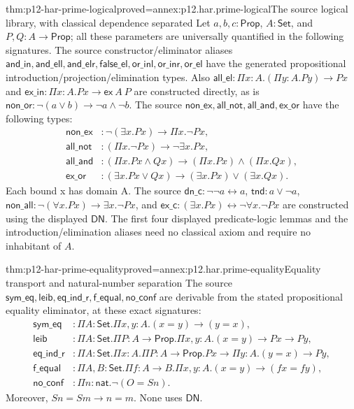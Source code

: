 \begin{hblemma}{thm:p12-har-prime-logical}{proved=annex:p12.har.prime-logical}{The source logical library, with classical dependence separated}
Let \(a,b,c:\mathsf{Prop}\), \(A:\mathsf{Set}\), and
\(P,Q:A\to\mathsf{Prop}\); all these parameters are universally
quantified in the following signatures.
The source constructor/eliminator aliases
\(\mathsf{and\_in},\mathsf{and\_ell},\mathsf{and\_elr},
\mathsf{false\_el},\mathsf{or\_inl},\mathsf{or\_inr},\mathsf{or\_el}\)
have the generated propositional introduction/projection/elimination
types. Also \(\mathsf{all\_el}:\Pi x:A.(\Pi y:A.P y)\to P x\)
and \(\mathsf{ex\_in}:\Pi x:A.P x\to\mathsf{ex}\ A\ P\)
are constructed directly, as is
\(\mathsf{non\_or}:\neg(a\vee b)\to\neg a\wedge\neg b\).
The source \(\mathsf{non\_ex},\mathsf{all\_not},\mathsf{all\_and},
\mathsf{ex\_or}\) have the following types:
\[
\begin{aligned}
 \mathsf{non\_ex}&:\neg(\exists x.P x)\to\Pi x.\neg P x,\\
 \mathsf{all\_not}&:(\Pi x.\neg P x)\to\neg\exists x.P x,\\
 \mathsf{all\_and}&:(\Pi x.P x\wedge Q x)\to
                         (\Pi x.P x)\wedge(\Pi x.Q x),\\
 \mathsf{ex\_or}&:(\exists x.P x\vee Q x)\to
                         (\exists x.P x)\vee(\exists x.Q x).
\end{aligned}
\]
Each bound x has domain A. The source
\(\mathsf{dn\_c}:\neg\neg a\leftrightarrow a\),
\(\mathsf{tnd}:a\vee\neg a\),
\(\mathsf{non\_all}:\neg(\forall x.P x)\to\exists x.\neg P x\),
and \(\mathsf{ex\_c}:(\exists x.P x)\leftrightarrow\neg\forall x.\neg P x\)
are constructed using the displayed \(\mathsf{DN}\). The first four
displayed predicate-logic lemmas and the introduction/elimination aliases
need no classical axiom and require no inhabitant of \(A\).
\end{hblemma}

\begin{hblemma}{thm:p12-har-prime-equality}{proved=annex:p12.har.prime-equality}{Equality transport and natural-number separation}
The source \(\mathsf{sym\_eq},\mathsf{leib},\mathsf{eq\_ind\_r},
\mathsf{f\_equal},\mathsf{no\_conf}\) are derivable from the stated
propositional equality eliminator, at these exact signatures:
\[
\begin{aligned}
 \mathsf{sym\_eq}&:\Pi A:\mathsf{Set}.\Pi x,y:A.(x=y)\to(y=x),\\
 \mathsf{leib}&:\Pi A:\mathsf{Set}.\Pi P:A\to\mathsf{Prop}.
                   \Pi x,y:A.(x=y)\to P x\to P y,\\
 \mathsf{eq\_ind\_r}&:\Pi A:\mathsf{Set}.\Pi x:A.
    \Pi P:A\to\mathsf{Prop}.P x\to\Pi y:A.(y=x)\to P y,\\
 \mathsf{f\_equal}&:\Pi A,B:\mathsf{Set}.\Pi f:A\to B.
                        \Pi x,y:A.(x=y)\to(f x=f y),\\
 \mathsf{no\_conf}&:\Pi n:\mathsf{nat}.\neg(O=S n).
\end{aligned}
\]
Moreover,
\(S n=S m\to n=m\). None uses \(\mathsf{DN}\).
\end{hblemma}

